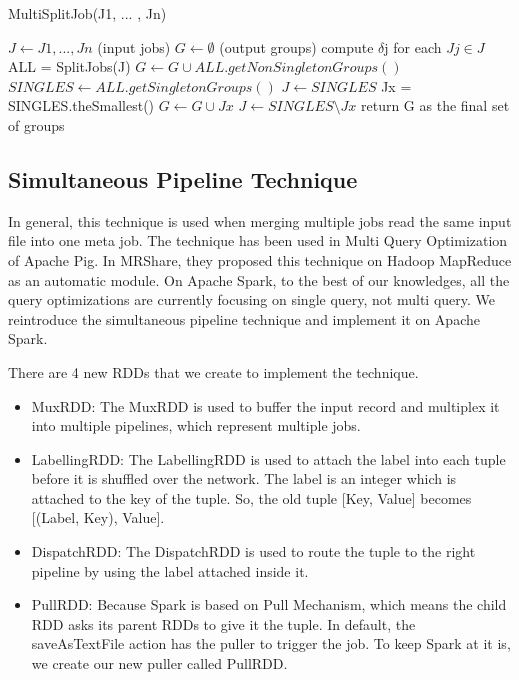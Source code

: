 \begin{algorithm}
\caption{MultiSplitJob(J1, ... , Jn)}
$J \leftarrow {J1, ... , Jn}$ (input jobs) \newline
$G \leftarrow \emptyset$ (output groups) \newline
{} {
	compute $\delta${j} for each $Jj  \in J$ \newline
	ALL = SplitJobs(J) \newline
	$G \leftarrow G \cup ALL.getNonSingletonGroups()$ \newline
	$SINGLES \leftarrow ALL.getSingletonGroups()$ \newline
	 {
		$J \leftarrow SINGLES$
	} {
		Jx = SINGLES.theSmallest() \newline
		$G \leftarrow G \cup {Jx}$ \newline
		$J \leftarrow SINGLES \setminus Jx$ \newline
	}
}
return G as the final set of groups
\end{algorithm}

\subsection{Simultaneous Pipeline Technique}

In general, this technique is used when merging multiple jobs read the same input file into one meta job. The technique has been used in Multi Query Optimization of Apache Pig. In MRShare, they proposed this technique on Hadoop MapReduce as an automatic module. On Apache Spark, to the best of our knowledges, all the query optimizations are currently focusing on single query, not multi query. We reintroduce the simultaneous pipeline technique and implement it on Apache Spark.

There are 4 new RDDs that we create to implement the technique.
\begin{itemize}
\item MuxRDD: The MuxRDD is used to buffer the input record and multiplex it into multiple pipelines, which represent multiple jobs.
\item LabellingRDD: The LabellingRDD is used to attach the label into each tuple before it is shuffled over the network. The label is an integer which is attached to the key of the tuple. So, the old tuple [Key, Value] becomes [(Label, Key), Value].
\item DispatchRDD: The DispatchRDD is used to route the tuple to the right pipeline by using the label attached inside it.
\item PullRDD: Because Spark is based on Pull Mechanism, which means the child RDD asks its parent RDDs to give it the tuple. In default, the saveAsTextFile action has the puller to trigger the job. To keep Spark at it is, we create our new puller called PullRDD.
\end{itemize}

